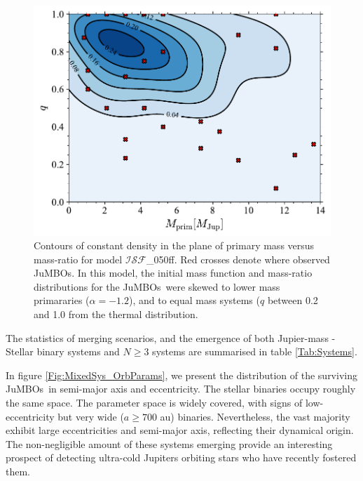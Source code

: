 \documentclass[submission,phys]{lib/SciPost}
\newcommand{\jumbos}{\mbox{JuMBOs}}
\begin{document}
   \begin{figure}
    \centering
    \includegraphics[width=0.75\columnwidth]{figures/Fractal_rvir0.5_Obs_mass_distr.pdf}
    \caption{Contours of constant density in the plane of primary mass
      versus mass-ratio for model $\mathcal{ISF}$\_050ff. Red crosses
      denote where observed \jumbos.  In this model, the initial mass
      function and mass-ratio distributions for the \jumbos\, were
      skewed to lower mass primararies ($\alpha = -1.2$), and to equal
      mass systems ($q$ between 0.2 and 1.0 from the thermal
      distribution.  }
         \label{Fig:FractalObs_mdistr}
   \end{figure}

The statistics of merging scenarios, and the emergence of both
Jupier-mass - Stellar binary systems and $N\geq3$ systems are
summarised in table \ref{Tab:Systems}.

In figure \ref{Fig:MixedSys_OrbParams}, we present the distribution of
the surviving \jumbos\, in semi-major axis and eccentricity. The
stellar binaries occupy roughly the same space.  The parameter space
is widely covered, with signs of low-eccentricity but very wide
($a\geq700$ au) binaries. Nevertheless, the vast majority exhibit
large eccentricities and semi-major axis, reflecting their dynamical
origin. The non-negligible amount of these systems emerging provide an
interesting prospect of detecting ultra-cold Jupiters orbiting stars
who have recently fostered them.
\end{document}
